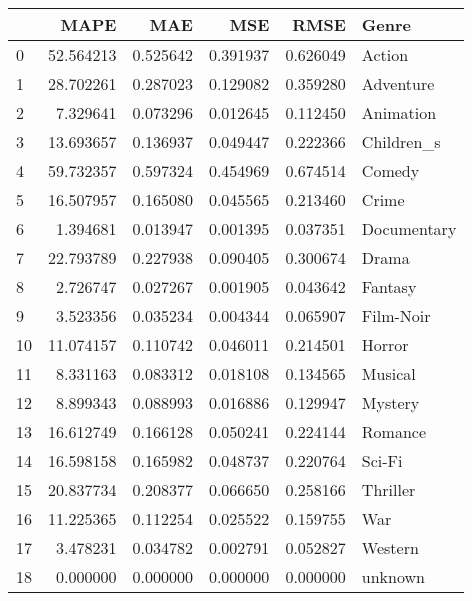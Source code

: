 \begin{tabular}{lrrrrl}
\toprule
 & MAPE & MAE & MSE & RMSE & Genre \\
\midrule
0 & 52.564213 & 0.525642 & 0.391937 & 0.626049 & Action \\
1 & 28.702261 & 0.287023 & 0.129082 & 0.359280 & Adventure \\
2 & 7.329641 & 0.073296 & 0.012645 & 0.112450 & Animation \\
3 & 13.693657 & 0.136937 & 0.049447 & 0.222366 & Children_s \\
4 & 59.732357 & 0.597324 & 0.454969 & 0.674514 & Comedy \\
5 & 16.507957 & 0.165080 & 0.045565 & 0.213460 & Crime \\
6 & 1.394681 & 0.013947 & 0.001395 & 0.037351 & Documentary \\
7 & 22.793789 & 0.227938 & 0.090405 & 0.300674 & Drama \\
8 & 2.726747 & 0.027267 & 0.001905 & 0.043642 & Fantasy \\
9 & 3.523356 & 0.035234 & 0.004344 & 0.065907 & Film-Noir \\
10 & 11.074157 & 0.110742 & 0.046011 & 0.214501 & Horror \\
11 & 8.331163 & 0.083312 & 0.018108 & 0.134565 & Musical \\
12 & 8.899343 & 0.088993 & 0.016886 & 0.129947 & Mystery \\
13 & 16.612749 & 0.166128 & 0.050241 & 0.224144 & Romance \\
14 & 16.598158 & 0.165982 & 0.048737 & 0.220764 & Sci-Fi \\
15 & 20.837734 & 0.208377 & 0.066650 & 0.258166 & Thriller \\
16 & 11.225365 & 0.112254 & 0.025522 & 0.159755 & War \\
17 & 3.478231 & 0.034782 & 0.002791 & 0.052827 & Western \\
18 & 0.000000 & 0.000000 & 0.000000 & 0.000000 & unknown \\
\bottomrule
\end{tabular}
